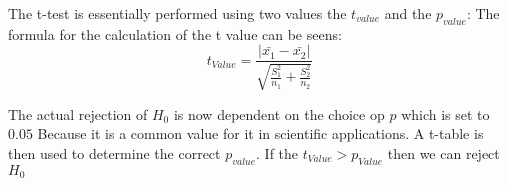 The t-test is essentially performed using two values the $t_{value}$ and the $p_{value}$:
The formula for the calculation of the t value can be seens:
$$t_{Value} = \frac{|\bar{x_1}- \bar{x_2}|}{\sqrt{\frac{S_1^2}{n_1} + \frac{S_2^2}{n_2}}}$$ 

The actual rejection of $H_0$ is now dependent on the choice op $p$ which is set to $0.05$ Because it is a common value for it in scientific applications. A t-table is then used to determine the correct $p_{value}$.
If the $t_{Value} > p_{Value}$ then we can reject $H_0$